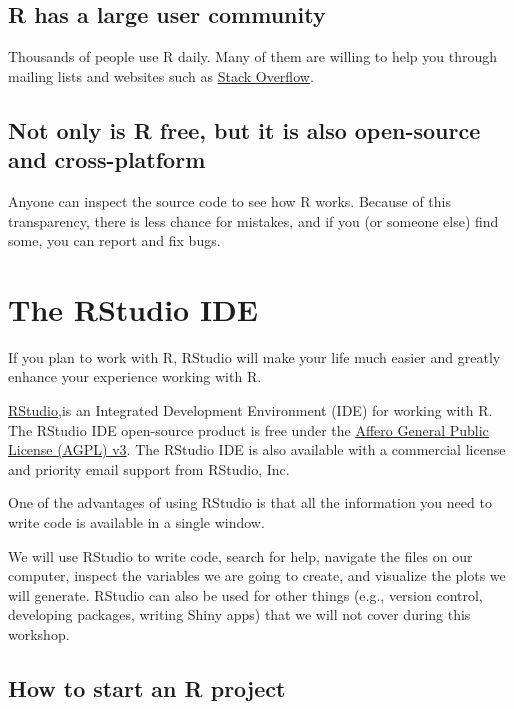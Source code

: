 \documentclass[
]{book}
\begin{document}
\subsection{R has a large user community}\label{r-has-a-large-user-community}

Thousands of people use R daily. Many of them are willing to help you through
mailing lists and websites such as \href{https://stackoverflow.com/questions/tagged/r}{Stack Overflow}.

\subsection{Not only is R free, but it is also open-source and cross-platform}\label{not-only-is-r-free-but-it-is-also-open-source-and-cross-platform}

Anyone can inspect the source code to see how R works. Because of this
transparency, there is less chance for mistakes, and if you (or someone else)
find some, you can report and fix bugs.

\section{The RStudio IDE}\label{the-rstudio-ide}

If you plan to work with R, RStudio will make your life much easier and greatly enhance your experience working with R.

\href{https://posit.co/products/open-source/rstudio/}{RStudio},is an Integrated Development Environment (IDE) for working with R. The RStudio IDE open-source product is free under the \href{https://www.gnu.org/licenses/agpl-3.0.en.html}{Affero General Public License (AGPL) v3}. The RStudio IDE is also available with a commercial license and priority email
support from RStudio, Inc.

One of the advantages of using RStudio is that all the information
you need to write code is available in a single window.

We will use RStudio to write code, search for help, navigate the files on our computer, inspect the variables we are going to create, and visualize the plots we will generate. RStudio can also be used for other things (e.g., version control, developing packages, writing Shiny apps) that we will not cover during this workshop.

\subsection{How to start an R project}\label{how-to-start-an-r-project}
\end{document}
